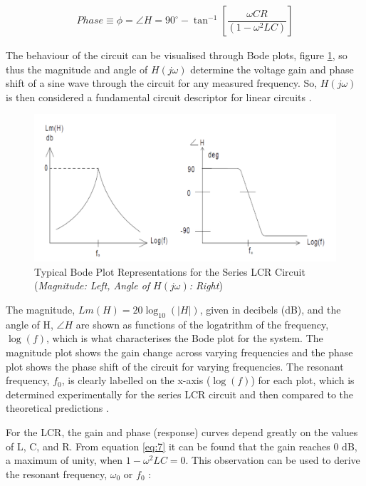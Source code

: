 \documentclass[12pt]{article}
\begin{document}
\begin{gather} \label{eq:8}
    Phase \equiv \phi = \angle H = 90 ^{\circ} - \tan^{-1} \left[ \dfrac{\omega CR}{(1 - \omega^2 LC)} \right]
\end{gather}

The behaviour of the circuit can be visualised through Bode plots, figure \ref{fig:bode}, so thus the magnitude and angle of $H(j \omega)$ determine the voltage gain and phase shift 
of a sine wave through the circuit for any measured frequency. So, $H (j \omega)$ is then considered a fundamental circuit descriptor for linear circuits \cite{UCDlcr}.

\begin{figure}[H]
    \centering
    \includegraphics[width=15cm]{BODE plot.png}
    \caption{\centering \footnotesize{Typical Bode Plot Representations for the Series LCR Circuit (\textit{Magnitude: Left, Angle of $H(j \omega)$: Right}) \protect\cite{UCDlcr}}}
    \label{fig:bode}
\end{figure}

The magnitude, $Lm(H) = 20 \log_{10} (\lvert H \rvert)$, given in decibels (dB), and the angle of H, $\angle H$ are shown as functions of the logatrithm of the frequency, $\log (f)$,
which is what characterises the Bode plot for the system.
The magnitude plot shows the gain change across varying frequencies and the phase plot shows the phase shift of the circuit for varying frequencies.
The resonant frequency, $f_0$, is clearly labelled on the x-axis ($\log (f)$) for each plot, which is determined experimentally for the series LCR circuit and then 
compared to the theoretical predictions \cite{UCDlcr}.

For the LCR, the gain and phase (response) curves depend greatly on the values of L, C, and R. From equation \ref{eq:7} it can be found that
the gain reaches 0 dB, a maximum of unity, when $1 - \omega^2 LC = 0$. This observation can be used to derive the resonant frequency, $\omega_0$ or $f_0$ \cite{UCDlcr}:
\end{document}
